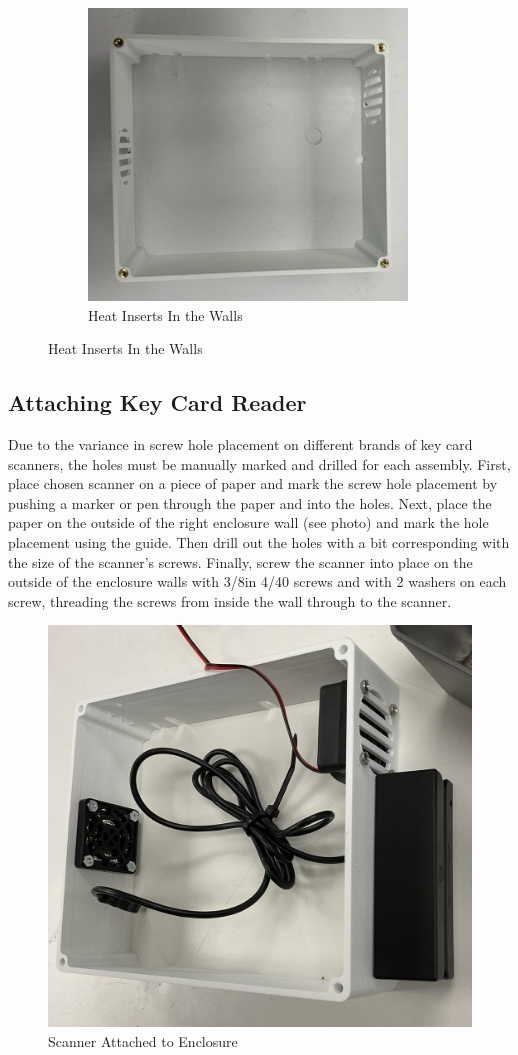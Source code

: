 \begin{figure}[H]
\begin{subfigure}{.45\textwidth}
            \includegraphics[width=\textwidth]{graphics/Enclosure Walls.jpeg}
            \caption{Heat Inserts In the Walls}
            \label{fig:Lid Heat Inserts 2}
        \end{subfigure}
    \end{figure}
\pagebreak
\subsection{Attaching Key Card Reader}
Due to the variance in screw hole placement on different brands of key card scanners, the holes must be manually marked and drilled for each assembly. First, place chosen scanner on a piece of paper and mark the screw hole placement by pushing a marker or pen through the paper and into the holes. Next, place the paper on the outside of the right enclosure wall (see photo) and mark the hole placement using the guide. Then drill out the holes with a bit corresponding with the size of the scanner's screws. 
Finally, screw the scanner into place on the outside of the enclosure walls with 3/8in 4/40 screws and with 2 washers on each screw, threading the screws from inside the wall through to the scanner.
\begin{figure}[H]
        \centering
        \includegraphics[width=.5\textwidth]{graphics/Scanner.jpg}
        \caption{Scanner Attached to Enclosure}
        \label{fig:Scanner}
    \end{figure}
\pagebreak
